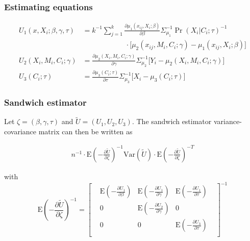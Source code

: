 \documentclass[]{article}
\begin{document}
\subsubsection*{Estimating equations}

\begin{align*}
\displaystyle U_{1}(x,X_i;\beta,\gamma,\tau) &= k^{-1} \sum_{j=1}^{k} \frac{\partial \mu_1(x_{ij},X_i;\beta)}{\partial \beta} \Sigma_{\mu_1}^{-1} \Pr(X_i\vert C_i; \tau)^{-1} \\[-0.6em] & \qquad \qquad \qquad \cdot \big[ \mu_2(x_{ij},M_i,C_i;\gamma) - \mu_1(x_{ij},X_i;\beta) \big]\\[1em]
\displaystyle U_{2}(X_i,M_i,C_i;\gamma) &= \frac{\partial \mu_2(X_i,M_i,C_i;\gamma)}{\partial \gamma} \Sigma_{\mu_2}^{-1} \big[ Y_i - \mu_2(X_i,M_i,C_i;\gamma) \big]\\[1em]
\displaystyle U_{3}(C_i;\tau) &= \frac{\partial \mu_3(C_i;\tau)}{\partial \tau} \Sigma_{\mu_3}^{-1} \big[ X_i - \mu_3(C_i;\tau) \big]
\end{align*}

\subsubsection*{Sandwich estimator}

Let $\zeta = (\beta, \gamma, \tau)$ and $\tilde U = (U_1, U_2, U_3)$. The sandwich estimator variance-covariance matrix can then be written as

\begin{eqnarray*}
\displaystyle n^{-1}\cdot\mbox{E}\left(-\frac{\partial \tilde U}{\partial \zeta}\right)^{-1} \mbox{Var}(\tilde U) \cdot \mbox{E}\left(-\frac{\partial \tilde U}{\partial \zeta}\right)^{-T}
\end{eqnarray*}

\noindent with 
\[
\renewcommand\arraystretch{2.5}
\displaystyle \mbox{E}\left(-\frac{\partial \tilde U}{\partial \zeta}\right)^{-1} = 
\begin{bmatrix}
& \displaystyle\mbox{E}\left(-\frac{\partial U_1}{\partial \beta}\right) & \displaystyle\mbox{E}\left(-\frac{\partial U_1}{\partial \gamma}\right) & \displaystyle\mbox{E}\left(-\frac{\partial U_1}{\partial \tau}\right) &\\
& 0 & \displaystyle\mbox{E}\left(-\frac{\partial U_2}{\partial \gamma}\right) & 0 &\\
& 0 & 0 & \displaystyle\mbox{E}\left(-\frac{\partial U_3}{\partial \tau}\right) &\\
\end{bmatrix}^{-1}
\]
\end{document}
